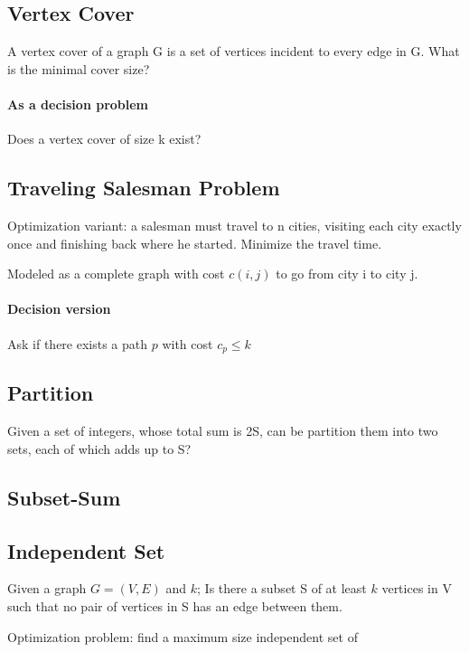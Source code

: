 \documentclass[a4paper]{article}
\begin{document}

\subsection{Vertex Cover}
A vertex cover of a graph G is a set of vertices incident to every edge in G. What is the minimal cover size?

\paragraph{As a decision problem}
Does a vertex cover of size k exist?

\subsection{Traveling Salesman Problem}
Optimization variant: a salesman must travel to n cities, visiting each city exactly once and finishing back where he started. Minimize the travel time.

Modeled as a complete graph with cost $c(i,j)$ to go from city i to city j.

\paragraph{Decision version}
Ask if there exists a path $p$ with cost $c_p \le k$


\subsection{Partition}
Given a set of integers, whose total sum is 2S, can be partition them into two sets, each of which adds up to S?

\subsection{Subset-Sum}

\subsection{Independent Set}
Given a graph $G=(V,E)$ and $k$; Is there a subset S of at least $k$ vertices in V such that no pair of vertices in S has an edge between them.

Optimization problem: find a maximum size independent set of 
\end{document}
